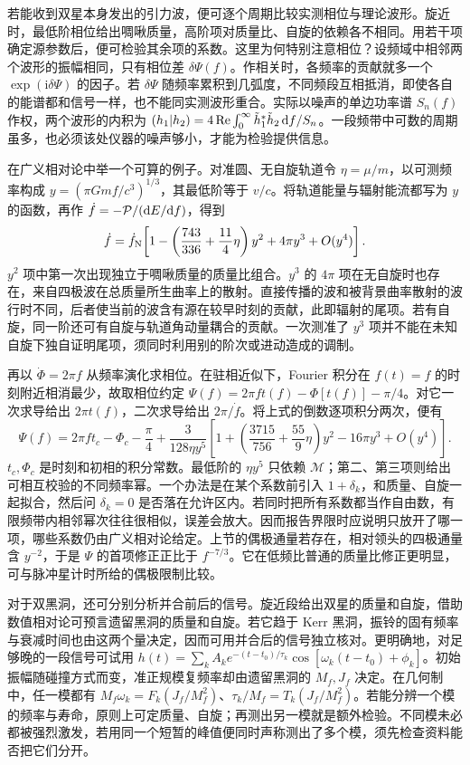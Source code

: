 若能收到双星本身发出的引力波，便可逐个周期比较实测相位与理论波形。旋近时，最低阶相位给出啁啾质量，高阶项对质量比、自旋的依赖各不相同。用若干项确定源参数后，便可检验其余项的系数。这里为何特别注意相位？设频域中相邻两个波形的振幅相同，只有相位差 $\delta\Psi(f)$。作相关时，各频率的贡献就多一个 $\exp(\mathrm{i}\delta\Psi)$ 的因子。若 $\delta\Psi$ 随频率累积到几弧度，不同频段互相抵消，即使各自的能谱都和信号一样，也不能同实测波形重合。实际以噪声的单边功率谱 $S_n(f)$ 作权，两个波形的内积为 $(h_1|h_2)=4\operatorname{Re}\int_0^\infty\tilde h_1^*\tilde h_2\,\dd f/S_n$。一段频带中可数的周期虽多，也必须该处仪器的噪声够小，才能为检验提供信息。

在广义相对论中举一个可算的例子。对准圆、无自旋轨道令 $\eta=\mu/m$，以可测频率构成 $y=(\pi Gmf/c^3)^{1/3}$，其最低阶等于 $v/c$。将轨道能量与辐射能流都写为 $y$ 的函数，再作 $\dot f=-\mathcal P/(\dd E/\dd f)$，得到
\[
 \dot f=\dot f_{\rm N}\!
 \left[1-\left(\frac{743}{336}+\frac{11}{4}\eta\right)y^2
             +4\pi y^3+O(y^4)\right].
\]
$y^2$ 项中第一次出现独立于啁啾质量的质量比组合。$y^3$ 的 $4\pi$ 项在无自旋时也存在，来自四极波在总质量所生曲率上的散射。直接传播的波和被背景曲率散射的波行时不同，后者使当前的波含有源在较早时刻的贡献，此即辐射的尾项。若有自旋，同一阶还可有自旋与轨道角动量耦合的贡献。一次测准了 $y^3$ 项并不能在未知自旋下独自证明尾项，须同时利用别的阶次或进动造成的调制。

再以 $\dot\Phi=2\pi f$ 从频率演化求相位。在驻相近似下，Fourier 积分在 $f(t)=f$ 的时刻附近相消最少，故取相位约定 $\Psi(f)=2\pi f t(f)-\Phi[t(f)]-\pi/4$。对它一次求导给出 $2\pi t(f)$，二次求导给出 $2\pi/\dot f$。将上式的倒数逐项积分两次，便有
\[
 \Psi(f)=2\pi f t_c-\Phi_c-\frac{\pi}{4}
 +\frac{3}{128\eta y^5}
 \left[1+\left(\frac{3715}{756}+\frac{55}{9}\eta\right)y^2
             -16\pi y^3+O(y^4)\right].
\]
$t_c,\Phi_c$ 是时刻和初相的积分常数。最低阶的 $\eta y^5$ 只依赖 $\mathcal M$；第二、第三项则给出可相互校验的不同频率幂。一个办法是在某个系数前引入 $1+\delta_k$，和质量、自旋一起拟合，然后问 $\delta_k=0$ 是否落在允许区内。若同时把所有系数都当作自由数，有限频带内相邻幂次往往很相似，误差会放大。因而报告界限时应说明只放开了哪一项，哪些系数仍由广义相对论给定。上节的偶极通量若存在，相对领头的四极通量含 $y^{-2}$，于是 $\Psi$ 的首项修正正比于 $f^{-7/3}$。它在低频比普通的质量比修正更明显，可与脉冲星计时所给的偶极限制比较。

对于双黑洞，还可分别分析并合前后的信号。旋近段给出双星的质量和自旋，借助数值相对论可预言遗留黑洞的质量和自旋。若它趋于 Kerr 黑洞，振铃的固有频率与衰减时间也由这两个量决定，因而可用并合后的信号独立核对。更明确地，对足够晚的一段信号可试用 $h(t)=\sum_k A_k e^{-(t-t_0)/\tau_k}\cos[\omega_k(t-t_0)+\phi_k]$。初始振幅随碰撞方式而变，准正规模复频率却由遗留黑洞的 $M_f,J_f$ 决定。在几何制中，任一模都有 $M_f\omega_k=F_k(J_f/M_f^2)$、$\tau_k/M_f=T_k(J_f/M_f^2)$。若能分辨一个模的频率与寿命，原则上可定质量、自旋；再测出另一模就是额外检验。不同模未必都被强烈激发，若用同一个短暂的峰值便同时声称测出了多个模，须先检查资料能否把它们分开。

